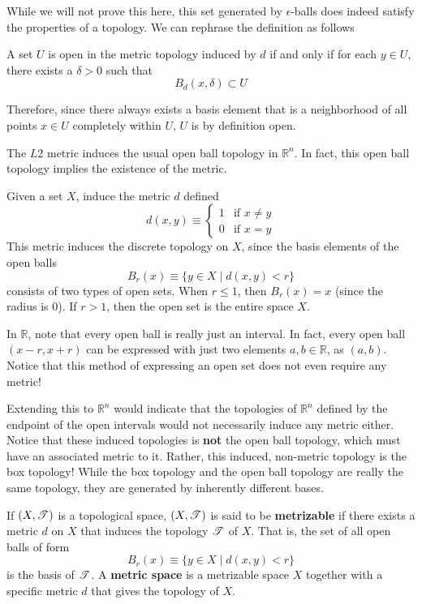   While we will not prove this here, this set generated by $\epsilon$-balls does indeed satisfy the properties of a topology. We can rephrase the definition as follows 

  \begin{definition}
  A set $U$ is open in the metric topology induced by $d$ if and only if for each $y \in U$, there exists a $\delta > 0$ such that 
  \[B_d (x, \delta) \subset U\]
  \end{definition}
  Therefore, since there always exists a basis element that is a neighborhood of all points $x \in U$ completely within $U$, $U$ is by definition open. 

  \begin{example}
  The $L2$ metric induces the usual open ball topology in $\mathbb{R}^n$. In fact, this open ball topology implies the existence of the metric. 
  \end{example}

  \begin{example}
  Given a set $X$, induce the metric $d$ defined
  \[d(x, y) \equiv \begin{cases}
        1 & \text{if } x \neq y \\
        0 & \text{if } x = y
  \end{cases}\]
  This metric induces the discrete topology on $X$, since the basis elements of the open balls
  \[B_r (x) \equiv \{ y \in X \; | \; d(x, y) <r\}\]
  consists of two types of open sets. When $r \leq 1$, then $B_r (x) = x$ (since the radius is $0$). If $r > 1$, then the open set is the entire space $X$. 
  \end{example}

  In $\mathbb{R}$, note that every open ball is really just an interval. In fact, every open ball $(x - r, x + r)$ can be expressed with just two elements $a, b \in \mathbb{R}$, as $(a, b)$. Notice that this method of expressing an open set does not even require any metric! 

  Extending this to $\mathbb{R}^n$ would indicate that the topologies of $\mathbb{R}^n$ defined by the endpoint of the open intervals would not necessarily induce any metric either. Notice that these induced topologies is \textbf{not} the open ball topology, which must have an associated metric to it. Rather, this induced, non-metric topology is the box topology! While the box topology and the open ball topology are really the same topology, they are generated by inherently different bases. 

  \begin{definition}
  If $(X, \operatorname{\mathscr{T}})$ is a topological space, $(X, \operatorname{\mathscr{T}})$ is said to be \textbf{metrizable} if there exists a metric $d$ on $X$ that induces the topology $\operatorname{\mathscr{T}}$ of $X$. That is, the set of all open balls of form
  \[B_r (x) \equiv \{ y \in X \; | \; d(x, y) < r \}\]
  is the basis of $\operatorname{\mathscr{T}}$. A \textbf{metric space} is a metrizable space $X$ together with a specific metric $d$ that gives the topology of $X$. 
  \end{definition}

